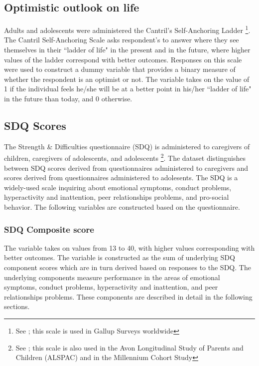 \subsection{Optimistic outlook on life}
Adults and adolescents were administered the Cantril's Self-Anchoring Ladder \footnote{See \cite{Cantril1965}; this scale is used in Gallup Surveys worldwide}. The Cantril Self-Anchoring Scale asks respondent's to answer where they see themselves in their ``ladder of life" in the present and in the future, where higher values of the ladder correspond with better outcomes. Responses on this scale were used to construct a dummy variable that provides a binary measure of whether the respondent is an optimist or not. The variable takes on the value of 1 if the individual feels he/she will be at a better point in his/her ``ladder of life" in the future than today, and 0 otherwise.

\subsection{SDQ Scores}
The  Strength \& Difficulties questionnaire (SDQ) is administered to caregivers of children, caregivers of adolescents, and adolescents \footnote{See \cite{Goodman1997}; this scale is also used in the Avon Longitudinal
Study of Parents and Children (ALSPAC) and in the Millennium Cohort Study}. The dataset distinguishes between SDQ scores derived from questionnaires administered to caregivers and scores derived from questionnaires administered to adolesents. The SDQ is a widely-used scale inquiring about emotional symptoms, conduct problems, hyperactivity and inattention, peer relationships problems, and pro-social behavior. The following variables are constructed based on the questionnaire.

\subsubsection{SDQ Composite score}
The variable takes on values from 13 to 40, with higher values corresponding with better outcomes. The variable is constructed as the sum of underlying SDQ component scores which are in turn derived based on responses to the SDQ. The underlying components measure performance in the areas of emotional symptoms, conduct problems, hyperactivity and inattention, and peer relationships problems. These components are described in detail in the following sections.

